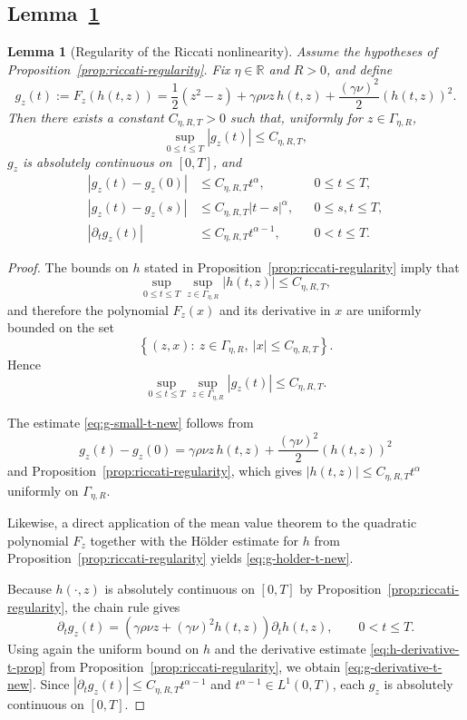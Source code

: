 \documentclass[letterpaper]{article}
\numberwithin{equation}{section}
\newtheorem{lemma}[theorem]{Lemma}
\theoremstyle{definition}
\theoremstyle{remark}
\newcommand{\R}{\mathbb{R}}
\begin{document}



\subsection{Lemma~\ref{lem:h-time-regularity}}\label{app:proof-h-time-regularity}

\begin{lemma}[Regularity of the Riccati nonlinearity]
\label{lem:h-time-regularity}
Assume the hypotheses of Proposition~\ref{prop:riccati-regularity}. Fix $\eta\in\R$ and $R>0$,
and define
\[
  g_z(t)
  :=
  F_z(h(t,z))
  =
  \frac12(z^2-z)+\gamma\rho\nu z\,h(t,z)+\frac{(\gamma\nu)^2}{2}(h(t,z))^2.
\]
Then there exists a constant $C_{\eta,R,T}>0$ such that, uniformly for
$z\in\Gamma_{\eta,R}$,
\[
  \sup_{0\le t\le T}|g_z(t)|\le C_{\eta,R,T},
\]
$g_z$ is absolutely continuous on $[0,T]$, and
\begin{align}
  |g_z(t)-g_z(0)| &\le C_{\eta,R,T}t^\alpha,
  &&0\le t\le T,\label{eq:g-small-t-new}\\
  |g_z(t)-g_z(s)| &\le C_{\eta,R,T}|t-s|^\alpha,
  &&0\le s,t\le T,\label{eq:g-holder-t-new}\\
  |\partial_t g_z(t)| &\le C_{\eta,R,T}t^{\alpha-1},
  &&0<t\le T.\label{eq:g-derivative-t-new}
\end{align}
\end{lemma}

\begin{proof}
The bounds on $h$ stated in Proposition~\ref{prop:riccati-regularity} imply that
\[
  \sup_{0\le t\le T}\sup_{z\in\Gamma_{\eta,R}}|h(t,z)|
  \le C_{\eta,R,T},
\]
and therefore the polynomial $F_z(x)$ and its derivative in $x$ are uniformly
bounded on the set
\[
  \left\{(z,x):\ z\in\Gamma_{\eta,R},\ |x|\le C_{\eta,R,T}\right\}.
\]
Hence
\[
  \sup_{0\le t\le T}\sup_{z\in\Gamma_{\eta,R}}|g_z(t)|
  \le C_{\eta,R,T}.
\]

The estimate \eqref{eq:g-small-t-new} follows from
\[
  g_z(t)-g_z(0)
  =
  \gamma\rho\nu z\,h(t,z)+\frac{(\gamma\nu)^2}{2}\left(h(t,z)\right)^2
\]
and Proposition~\ref{prop:riccati-regularity}, which gives
$|h(t,z)|\le C_{\eta,R,T}t^\alpha$ uniformly on $\Gamma_{\eta,R}$.

Likewise, a direct application of the mean value theorem to the quadratic
polynomial $F_z$ together with the H\"older estimate for $h$ from
Proposition~\ref{prop:riccati-regularity} yields \eqref{eq:g-holder-t-new}.

Because $h(\cdot,z)$ is absolutely continuous on $[0,T]$ by
Proposition~\ref{prop:riccati-regularity}, the chain rule gives
\[
  \partial_t g_z(t)
  =
  \left(\gamma\rho\nu z+(\gamma\nu)^2 h(t,z)\right)\partial_t h(t,z),
  \qquad 0<t\le T.
\]
Using again the uniform bound on $h$ and the derivative estimate
\eqref{eq:h-derivative-t-prop} from
Proposition~\ref{prop:riccati-regularity}, we obtain
\eqref{eq:g-derivative-t-new}. Since
$|\partial_t g_z(t)|\le C_{\eta,R,T}t^{\alpha-1}$ and
$t^{\alpha-1}\in L^1(0,T)$, each $g_z$ is absolutely continuous on $[0,T]$.
\end{proof}
\end{document}
